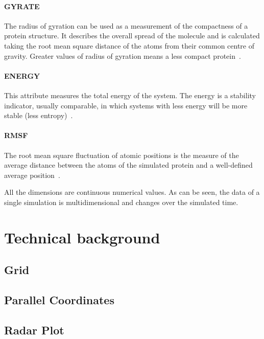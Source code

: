 \documentclass[10pt, conference]{IEEEtran}
\begin{document}
\paragraph*{GYRATE} The radius of gyration can be used as a measurement of the compactness of a protein structure. It describes the overall spread of the molecule and is calculated taking the root mean square distance of the atoms from their common centre of gravity. Greater values of radius of gyration means a less compact protein~\cite{lobanov2008radius}.
%

\paragraph*{ENERGY} This attribute measures the total energy of the system. The energy is a stability indicator, usually comparable, in which systems with less energy will be more stable (less entropy)~\cite{van1998gromos}.
%

\paragraph*{RMSF} The root mean square fluctuation of atomic positions is the measure of the average distance between the atoms of the simulated protein and a well-defined average position~\cite{maiorov1994significance}. 
%

All the dimensions are continuous numerical values. As can be seen, the data of a single simulation is multidimensional and changes over the simulated time.

\section{Technical background}
%

\subsection{Grid}

\subsection{Parallel Coordinates}

\subsection{Radar Plot}

\end{document}
